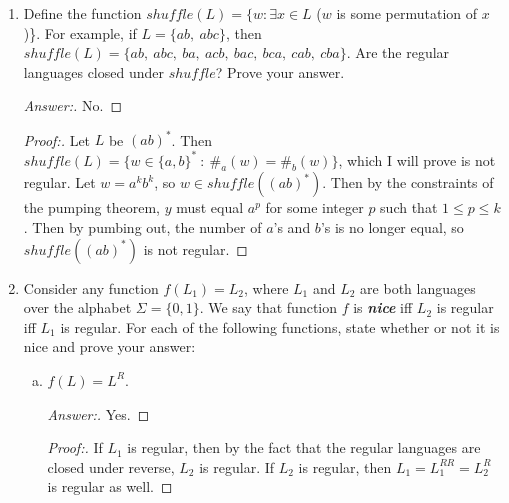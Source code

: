 \documentclass[10pt]{article}
\newcommand{\card}[1]{\left| #1 \right|}
\begin{document}
\begin{enumerate}[1)]
\begin{enumerate}[a)]
\pagebreak
\item
Are the nonregular languages closed under $midchar$?  Prove your answer.
\begin{proof}[Answer:]
No. (Assuming the set of nonregular languages is not defined as a superset of the regular languages.)
\end{proof}
\begin{proof}[Proof:]
Let $L$ be a nonregular language.  Since $c \in \Sigma$, we know that $\card{midChar(L)} \leq \Sigma _L$.  Therefore $midChar(L)$ is finite, and thus regular.
\end{proof}
\end{enumerate}

\item
Define the function $shuffle(L) = \{w : \exists x \in L$ ($w$ is some permutation of $x$)\}.  For example, if $L = \{ab,\ abc\}$, then $shuffle(L) = \{ab,\ abc,\ ba,\ acb,\ bac,\ bca,\ cab,\ cba\}$.  Are the regular languages closed under $shuffle$?  Prove your answer.
\begin{proof}[Answer:]
No.
\end{proof}
\begin{proof}[Proof:]
Let $L$ be $(ab)^*$.  Then $shuffle(L) = \{w \in \{a, b\}^*\ :\ \#_a(w) = \#_b(w)\}$, which I will prove is not regular.  Let $w = a^kb^k$, so $w \in shuffle((ab)^*)$.  Then by the constraints of the pumping theorem, $y$ must equal $a^p$ for some integer $p$ such that $1 \leq p \leq k$.  Then by pumbing out, the number of $a$'s and $b$'s is no longer equal, so $shuffle((ab)^*)$ is not regular.
\end{proof}

\item
Consider any function $f(L_1) = L_2$, where $L_1$ and $L_2$ are both languages over the alphabet $\Sigma = \{0, 1\}$.  We say that function $f$ is \textbf{\textit{nice}} iff  $L_2$ is regular iff $L_1$ is regular.  For each of the following functions, state whether or not it is nice and prove your answer:

\begin{enumerate}[a)]
\item
$f(L) = L^R$.
\begin{proof}[Answer:]
Yes.
\end{proof}
\begin{proof}[Proof:]
If $L_1$ is regular, then by the fact that the regular languages are closed under reverse, $L_2$ is regular.  If $L_2$ is regular, then $L_1 = L_1^{RR} = L_2^R$ is regular as well.
\end{proof}


\end{enumerate}
\end{enumerate}
\end{document}
